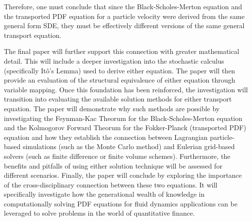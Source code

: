\documentclass[12pt, onecolumn, journal]{IEEEtran}
\begin{document}
\noindent Therefore, one must conclude that since the Black-Scholes-Merton equation and the transported PDF equation for a particle velocity were derived from the same general form SDE, they must be effectively different versions of the same general transport equation.

The final paper will further support this connection with greater mathematical detail. This will include a deeper investigation into the stochastic calculus (specifically Itô's Lemma) used to derive either equation. The paper will then provide an evaluation of the structural equivalence of either equation through variable mapping. Once this foundation has been reinforced, the investigation will transition into evaluating the available solution methods for either transport equation. The paper will demonstrate why such methods are possible by investigating the Feynman-Kac Theorum for the Black-Scholes-Merton equation and the Kolmogorov Forward Theorum for the Fokker-Planck (transported PDF) equation and how they establish the connection between Lagrangian particle-based simulations (such as the Monte Carlo method) and Eulerian grid-based solvers (such as finite difference or finite volume schemes). Furthermore, the benefits and pitfalls of using either solution technique will be assessed for different scenarios. Finally, the paper will conclude by exploring the importance of the cross-disciplinary connection between these two equations. It will specifically investigate how the generational wealth of knowledge in computationally solving PDF equations for fluid dynamics applications can be leveraged to solve problems in the world of quantitative finance.


\newpage

\end{document}
